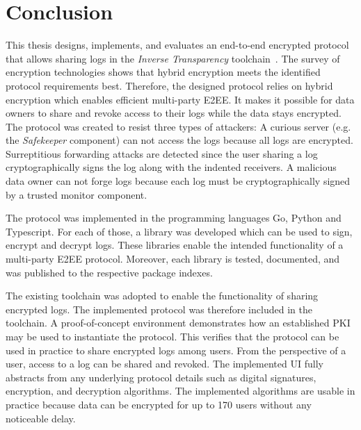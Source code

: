 \documentclass[../main.tex]{subfiles}
\begin{document}
\chapter{Conclusion}

This thesis designs, implements, and evaluates an end-to-end encrypted protocol that allows sharing logs in the \emph{Inverse Transparency} toolchain~\cite{Zieglmeier2021}.
The survey of encryption technologies shows that hybrid encryption meets the identified protocol requirements best.
Therefore, the designed protocol relies on hybrid encryption which enables efficient multi-party E2EE.
It makes it possible for data owners to share and revoke access to their logs while the data stays encrypted.
The protocol was created to resist three types of attackers: 
A curious server (e.g. the \emph{Safekeeper} component) can not access the logs because all logs are encrypted.
Surreptitious forwarding attacks are detected since the user sharing a log cryptographically signs the log along with the indented receivers.
A malicious data owner can not forge logs because each log must be cryptographically signed by a trusted monitor component.

The protocol was implemented in the programming languages Go, Python and Typescript.
For each of those, a library was developed which can be used to sign, encrypt and decrypt logs.
These libraries enable the intended functionality of a multi-party E2EE protocol.
Moreover, each library is tested, documented, and was published to the respective package indexes.

The existing toolchain was adopted to enable the functionality of sharing encrypted logs.
The implemented protocol was therefore included in the toolchain.
A proof-of-concept environment demonstrates how an established PKI may be used to instantiate the protocol.
This verifies that the protocol can be used in practice to share encrypted logs among users.
From the perspective of a user, access to a log can be shared and revoked.
The implemented UI fully abstracts from any underlying protocol details such as digital signatures, encryption, and decryption algorithms.
The implemented algorithms are usable in practice because data can be encrypted for up to 170 users without any noticeable delay.
\end{document}
